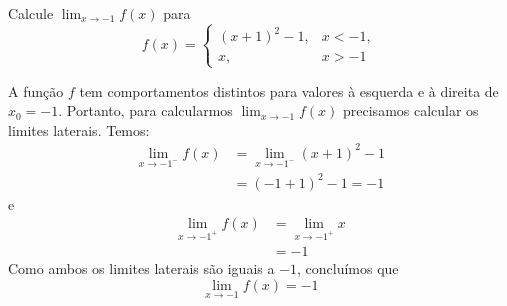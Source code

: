 \cleardoublepage\documentclass[../main.tex]{subfiles}
\begin{document}
\begin{exeresol}
  Calcule $\displaystyle\lim_{x\to -1} f(x)$ para
  \begin{equation*}
    f(x) = \left\{
      \begin{array}{ll}
        (x+1)^2-1, & x<-1,\\
        x, & x>-1
      \end{array}
\right.
  \end{equation*}
  \begin{resol}
  A função $f$ tem comportamentos distintos para valores à esquerda e à direita de $x_0=-1$. Portanto, para calcularmos $\displaystyle\lim_{x\to -1} f(x)$ precisamos calcular os limites laterais. Temos:
  \begin{align*}
    \lim_{x\to -1^-} f(x) &= \lim_{x\to -1^-} (x+1)^2-1\\
                          &= (-1+1)^2-1 = -1
  \end{align*}
  e
  \begin{align*}
    \lim_{x\to -1^+} f(x) &= \lim_{x\to -1^+} x\\
                          &= -1
  \end{align*}
  Como ambos os limites laterais são iguais a $-1$, concluímos que
  \begin{equation*}
    \lim_{x\to -1} f(x) = -1
  \end{equation*}
\end{resol}
\end{exeresol}
\end{document}
